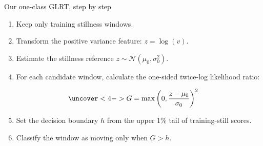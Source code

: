 \documentclass[aspectratio=169,10pt]{beamer}
\begin{document}
\begin{frame}{Our one-class GLRT, step by step}
  \begin{enumerate}
    \item<1-> Keep only \alert{training stillness} windows.
    \item<2-> Transform the positive variance feature: $z=\log(v)$.
    \item<3-> Estimate the stillness reference $z\sim\mathcal{N}(\mu_0,\sigma_0^2)$.
    \item<4-> For each candidate window, calculate the one-sided twice-log likelihood ratio:
  \end{enumerate}
  \vspace{-.05cm}
  \begin{equation*}
    \uncover<4->{G=\max\left(0,\frac{z-\mu_0}{\sigma_0}\right)^2}
  \end{equation*}
  \begin{enumerate}
    \setcounter{enumi}{4}
    \item<5-> Set the decision boundary $h$ from the upper 1\% tail of \alert{training-still} scores.
    \item<6-> Classify the window as moving only when $G>h$.
  \end{enumerate}
\end{frame}
\end{document}
